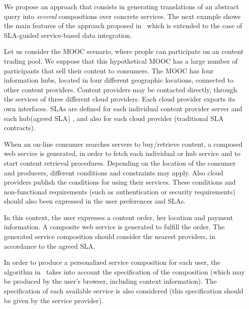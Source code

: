 We propose an approach that consists in generating translations of an abstract query into \textit{several}  compositions over concrete  services. 
The next example shows the main features of the approach proposed in~\cite{CostaAMR13} which is extended to the case of SLA-guided service-based data integration. 

Let us consider the MOOC scenario, where people can participate on an content trading pool.
We suppose that this hypothetical MOOC has a large number of participants that sell their content  to  consumers. 
The MOOC has four information hubs, located in four different geographic locations, connected to other content providers.
Content providers may be  contacted directly, through the services of three different cloud providers.
Each cloud provider exports its own interfaces.
SLAs are defined for each individual content provider server and  each hub(agreed SLA)  , and also for each cloud provider (traditional SLA contracts). 

When an on-line consumer searches servers to buy/retrieve content, a composed web service is generated, in order to fetch each individual or hub service and to start  content retrieval procedures.
Depending on the location of the consumer and producers, different conditions and constraints may apply.
Also  cloud providers  publish the conditions for using their services.
These conditions and non-functional requirements (such as authentication or security requirements) should also been expressed in the user preferences and SLAs.

In this context, the user  expresses a content order, her location and payment information. A composite web service is  generated to fulfill the order.
The generated service composition should consider the nearest providers, in accordance to the agreed SLA.

In order to produce a personalized service composition for each user, the algorithm in~\cite{CostaAMR13} takes into account the specification of the composition (which may be produced by the user's browser, including context information).
The specification of each available service is also considered (this specification should be given by the service provider).

\color{green}

